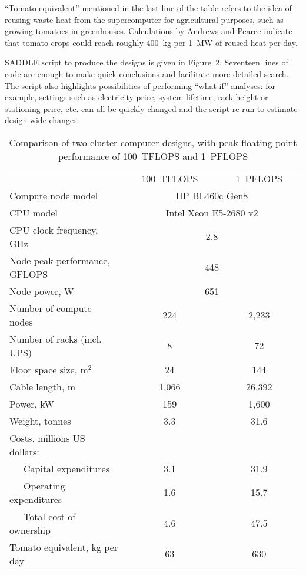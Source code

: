 \documentclass[runningheads,a4paper]{llncs}
\begin{document}
``Tomato equivalent'' mentioned in the last line of the table refers to the idea of reusing waste heat from the supercomputer for agricultural purposes, such as growing tomatoes in greenhouses. Calculations by Andrews and Pearce \cite{andrews2011environmental} indicate that tomato crops could reach roughly 400~kg per 1~MW of reused heat per day.

SADDLE script to produce the designs is given in Figure~2. Seventeen lines of code are enough to make quick conclusions and facilitate more detailed search. The script also highlights possibilities of performing ``what-if'' analyses: for example, settings such as electricity price, system lifetime, rack height or stationing price, etc. can all be quickly changed and the script re-run to estimate design-wide changes.

\begin{table}
\centering
\label{two-designs-table}
\caption{Comparison of two cluster computer designs, with peak floating-point performance of 100~TFLOPS and 1~PFLOPS}
\begin{tabular}{ l c c }
\hline\noalign{\smallskip}
& ~~~100~TFLOPS~~~ & ~~~1~PFLOPS~~~ \\
\noalign{\smallskip}
\hline
\noalign{\smallskip}
Compute node model & \multicolumn{2}{c}{ HP BL460c Gen8 } \\
CPU model & \multicolumn{2}{c}{ Intel Xeon E5-2680 v2 } \\
CPU clock frequency, GHz & \multicolumn{2}{c}{ 2.8 } \\
Node peak performance, GFLOPS & \multicolumn{2}{c}{ 448 } \\
Node power, W & \multicolumn{2}{c}{ 651 } \\
\noalign{\smallskip}
\hline
\noalign{\smallskip}
Number of compute nodes & 224 & 2,233 \\
Number of racks (incl. UPS) & 8 & 72 \\
Floor space size, m$^2$ & 24 & 144 \\
Cable length, m & 1,066 & 26,392 \\
Power, kW & 159 & 1,600 \\
Weight, tonnes & 3.3 & 31.6 \\
Costs, millions US dollars: & \multicolumn{2}{c}{ ~ } \\
~~~Capital expenditures & 3.1 & 31.9 \\
~~~Operating expenditures & 1.6 & 15.7 \\
~~~Total cost of ownership & 4.6 & 47.5 \\
Tomato equivalent, kg per day & 63 & 630 \\
\hline
\end{tabular}
\end{table}
\end{document}
